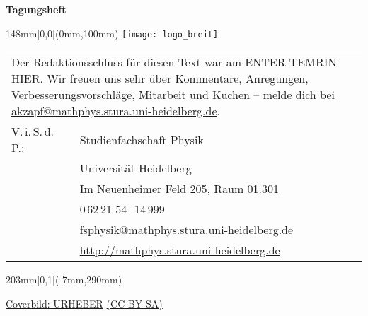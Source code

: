 \documentclass[a5paper]{scrbook}
\begin{document}
\pagestyle{empty}
\vspace*{30mm} \centering \fontsize{40}{48} \textbf{Tagungsheft}
\normalsize

\begin{textblock*}{148mm}[0,0](0mm,100mm)
    \texttt{[image: logo\_breit]} 
\end{textblock*}
  
\null
\newpage

\vspace*{\fill}
    \begin{tabular*}{0.77\textwidth}{ll}
        \multicolumn{2}{l}{
            \parbox{0.77\textwidth}{
                Der Redaktionsschluss für diesen Text war am ENTER TEMRIN HIER. Wir freuen uns
                sehr über Kommentare, Anregungen, Verbesserungsvorschläge,
                Mitarbeit und Kuchen -- melde dich bei
                \href{mailto:akzapf@mathphys.stura.uni-heidelberg.de}{akzapf@mathphys.stura.uni-heidelberg.de}.
            }
            \vspace{5cm}
        }\\
        V.\,i.\,S.\,d.\,P.: & Studienfachschaft Physik\\
        & Universität Heidelberg \\
        & Im Neuenheimer Feld 205, Raum 01.301\\
        & 0\,62\,21 54\,-\,14\,999\\
        & \href{mailto:fsphysik@mathphys.stura.uni-heidelberg.de}{fsphysik@mathphys.stura.uni-heidelberg.de}\\
        & \url{http://mathphys.stura.uni-heidelberg.de}\\
    \end{tabular*}

    \vfill

    \begin{textblock*}{203mm}[0,1](-7mm,290mm)
        \begin{flushright}
            \footnotesize
            \href{http://mathphys.info}{Coverbild: URHEBER} \href{http://creativecommons.org/licenses/by-sa/4.0/}{(CC-BY-SA)}\\  
        \end{flushright}
    \end{textblock*}



\null
\newpage

\pagestyle{empty}

\null
\newpage

\pagestyle{empty}
\end{document}
